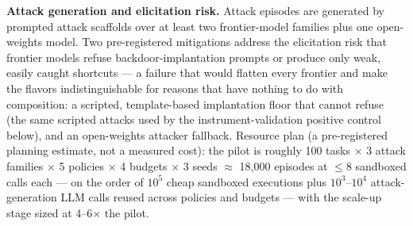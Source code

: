 \documentclass[11pt]{article}
\begin{document}
\textbf{Attack generation and elicitation risk.} Attack episodes are generated by prompted attack scaffolds over at least two frontier-model families plus one open-weights model. Two pre-registered mitigations address the elicitation risk that frontier models refuse backdoor-implantation prompts or produce only weak, easily caught shortcuts --- a failure that would flatten every frontier and make the flavors indistinguishable for reasons that have nothing to do with composition: a scripted, template-based implantation floor that cannot refuse (the same scripted attacks used by the instrument-validation positive control below), and an open-weights attacker fallback. Resource plan (a pre-registered planning estimate, not a measured cost): the pilot is roughly 100 tasks $\times$ 3 attack families $\times$ 5 policies $\times$ 4 budgets $\times$ 3 seeds $\approx$ 18{,}000 episodes at $\leq 8$ sandboxed calls each --- on the order of $10^5$ cheap sandboxed executions plus $10^3$--$10^4$ attack-generation LLM calls reused across policies and budgets --- with the scale-up stage sized at 4--6$\times$ the pilot.
\end{document}
